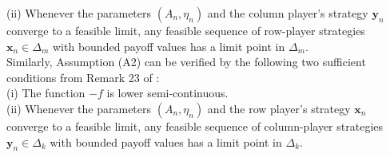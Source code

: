 \documentclass[12pt]{article}
\begin{document}
\begin{lemma}
(ii) Whenever the parameters \((A_n,\eta_n)\) and the column player's strategy 
\(\bm y_n\) converge to a feasible limit, any feasible sequence of row-player strategies 
\(\bm x_n\in\Delta_m\) with bounded payoff values has a limit point in \(\Delta_m\). \\
Similarly, Assumption (A2) can be verified by the following two sufficient conditions from Remark 23 of \citet{feinberg2022continuity}: \\
(i) The function \(-f\) is lower semi-continuous. \\
(ii) Whenever the parameters \((A_n,\eta_n)\) and the row player's strategy 
\(\bm x_n\) converge to a feasible limit, any feasible sequence of column-player strategies 
\(\bm y_n\in\Delta_k\) with bounded payoff values has a limit point in \(\Delta_k\). \\
\end{lemma}
\end{document}

